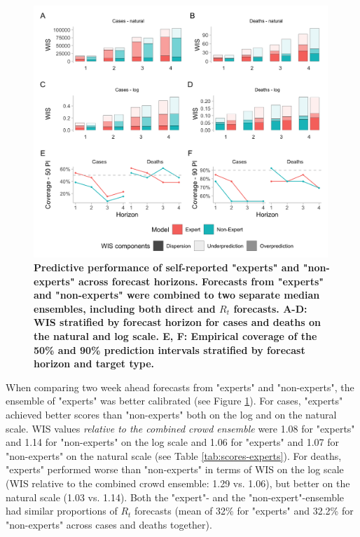\documentclass[10pt,a4paper,twocolumn]{article}
\begin{document}
\begin{figure}
\centering
\includegraphics[width=0.99\textwidth]{../output/figures/performance-expert.png}
\caption{\bf{Predictive performance of self-reported "experts" and "non-experts" across forecast horizons.} Forecasts from "experts" and "non-experts" were combined to two separate median ensembles, including both direct and $R_t$ forecasts. A-D: WIS stratified by forecast horizon for cases and deaths on the natural and log scale. E, F: Empirical coverage of the 50\% and 90\% prediction intervals stratified by forecast horizon and target type.}
\label{fig:performance-experts}
\end{figure}





When comparing two week ahead forecasts from "experts" and "non-experts", the ensemble of "experts" was better calibrated (see Figure \ref{fig:performance-experts}). For cases, "experts" achieved better scores than "non-experts" both on the log and on the natural scale. WIS values \textit{relative to the combined crowd ensemble} were 1.08 for "experts" and 1.14 for "non-experts" on the log scale and 1.06 for "experts" and 1.07 for "non-experts" on the natural scale (see Table \ref{tab:scores-experts}).  
For deaths, "experts" performed worse than "non-experts" in terms of WIS on the log scale (WIS relative to the combined crowd ensemble: 1.29 vs. 1.06), but better on the natural scale (1.03 vs. 1.14). Both the "expert"- and the "non-expert"-ensemble had similar proportions of $R_t$ forecasts (mean of 32\% for "experts" and 32.2\% for "non-experts" across cases and deaths together). 
\end{document}

